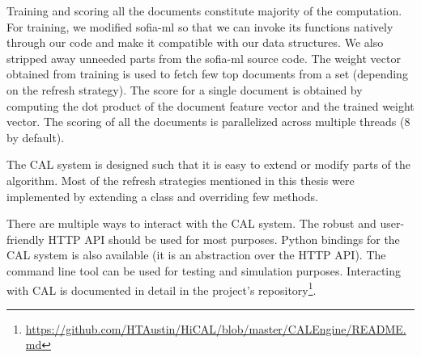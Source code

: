 Training and scoring all the documents constitute majority of the computation.
For training, we modified sofia-ml so that we can invoke its functions natively
through our code and make it compatible with our data structures. We also
stripped away unneeded parts from the sofia-ml source code. The weight vector
obtained from training is used to fetch few top documents from a set (depending
on the refresh strategy). The score for a single document is obtained by
computing the dot product of the document feature vector and the trained
weight vector. The scoring of all the documents is parallelized across multiple
threads (8 by default).

The CAL system is designed such that it is easy to extend or modify parts of the
algorithm. Most of the refresh strategies mentioned in this thesis were
implemented by extending a class and overriding few methods.

There are multiple ways to interact with the CAL system. The robust and user-friendly
HTTP API should be used for most purposes. Python bindings for the CAL system is
also available (it is an abstraction over the HTTP API). The command line tool
can be used for testing and simulation purposes. Interacting with CAL is
documented in detail in the project's
repository\footnote{\url{https://github.com/HTAustin/HiCAL/blob/master/CALEngine/README.md}}.
